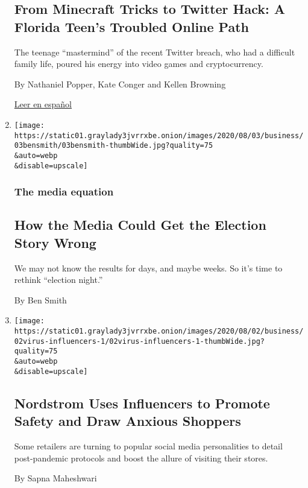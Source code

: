 \begin{enumerate}
  \hypertarget{from-minecraft-tricks-to-twitter-hack-a-florida-teens-troubled-online-path}{%
  \subsection{From Minecraft Tricks to Twitter Hack: A Florida Teen's
  Troubled Online
  Path}\label{from-minecraft-tricks-to-twitter-hack-a-florida-teens-troubled-online-path}}

  The teenage ``mastermind'' of the recent Twitter breach, who had a
  difficult family life, poured his energy into video games and
  cryptocurrency.

  By Nathaniel Popper, Kate Conger and Kellen Browning

  \href{https://www.nytimes3xbfgragh.onion/es/2020/08/04/espanol/negocios/joven-florida-hacker-twitter.html}{Leer
  en español}
\item
  \href{/2020/08/02/business/media/election-coverage.html}{}

  \texttt{[image: https://static01.graylady3jvrrxbe.onion/images/2020/08/03/business/03bensmith/03bensmith-thumbWide.jpg?quality=75\\\&auto=webp\\\&disable=upscale]}

  \hypertarget{the-media-equation}{%
  \subsubsection{The media equation}\label{the-media-equation}}

  \hypertarget{how-the-media-could-get-the-election-story-wrong}{%
  \subsection{How the Media Could Get the Election Story
  Wrong}\label{how-the-media-could-get-the-election-story-wrong}}

  We may not know the results for days, and maybe weeks. So it's time to
  rethink ``election night.''

  By Ben Smith
\item
  \href{/2020/08/02/business/media/coronavirus-nordstrom-infuencers.html}{}

  \texttt{[image: https://static01.graylady3jvrrxbe.onion/images/2020/08/02/business/02virus-influencers-1/02virus-influencers-1-thumbWide.jpg?quality=75\\\&auto=webp\\\&disable=upscale]}

  \hypertarget{nordstrom-uses-influencers-to-promote-safety-and-draw-anxious-shoppers}{%
  \subsection{Nordstrom Uses Influencers to Promote Safety and Draw
  Anxious
  Shoppers}\label{nordstrom-uses-influencers-to-promote-safety-and-draw-anxious-shoppers}}

  Some retailers are turning to popular social media personalities to
  detail post-pandemic protocols and boost the allure of visiting their
  stores.

  By Sapna Maheshwari
\end{enumerate}

